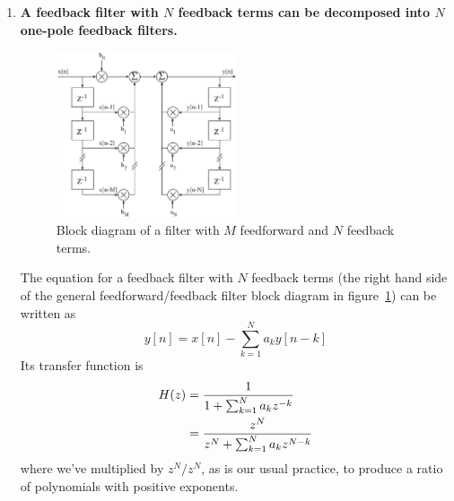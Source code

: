 \begin{enumerate}
\item \textbf{A feedback filter with $N$ feedback terms can be decomposed into
$N$ one-pole feedback filters.}

\begin{figure}
\centerline{\includegraphics[width=0.5\textwidth]{ch-iir/fb-nterm-bdiag}}
\caption{Block diagram of a filter with $M$ feedforward and $N$
  feedback terms.\label{fig:fb-nterm-bdiag}}
\end{figure}

The equation for a feedback filter with $N$ feedback terms (the right
hand side of the general feedforward/feedback filter block diagram in
figure~\ref{fig:fb-nterm-bdiag}) can be written as
\begin{equation}
y[n] = x[n] - \sum_{k=1}^N a_k y[n-k]
\end{equation}
Its transfer function is 
\begin{align}
H(z) &= \frac{1}{1 + \sum_{k=1}^N a_k z^{-k}} \notag \\
     &= \frac{z^N}{z^N+\sum_{k=1}^N a_k z^{N-k}} \label{eq:manypoles}
\end{align}
where we've multiplied by $z^N/z^N$, as is our usual practice, to
produce a ratio of polynomials with positive exponents.


\end{enumerate}
